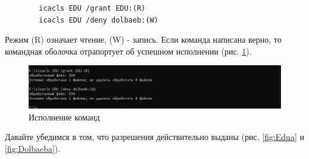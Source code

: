 \begin{verbatim}
        icacls EDU /grant EDU:(R)
        icacls EDU /deny dolbaeb:(W)
\end{verbatim}

Режим (R) означает чтение, (W) - запись. Если команда написана верно, то командная оболочка отрапортует об успешном исполнении (рис. \ref{fig:icaclsAccess}). 

\begin{figure}
    \centering
    \includegraphics[width=0.5\linewidth]{Pic/lab2/photo_2025-05-21_21-18-47.jpg}
    \caption{Исполнение команд}
    \label{fig:icaclsAccess}
\end{figure}

Давайте убедимся в том, что разрешения действительно выданы (рис. \ref{fig:Edua} и \ref{fig:Dolbaeba}).

